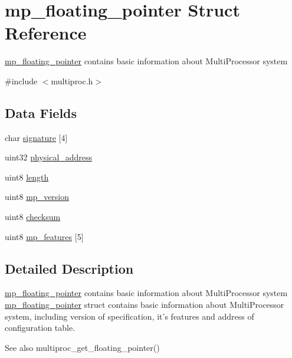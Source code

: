 \hypertarget{structmp__floating__pointer}{
\section{mp\_\-floating\_\-pointer Struct Reference}
\label{structmp__floating__pointer}
}


\hyperlink{structmp__floating__pointer}{mp\_\-floating\_\-pointer} contains basic information about MultiProcessor system  




{\ttfamily \#include $<$multiproc.h$>$}

\subsection*{Data Fields}
\begin{DoxyCompactItemize}
\item 
char \hyperlink{structmp__floating__pointer_a7a7d6817d70f64be4bfd36433f70aafa}{signature} \mbox{[}4\mbox{]}
\item 
uint32 \hyperlink{structmp__floating__pointer_aa3d9d8256dbd774b7c2dd6c18ad310e3}{physical\_\-address}
\item 
uint8 \hyperlink{structmp__floating__pointer_ade2aae9bc2dd565811eeed02d88f00e0}{length}
\item 
uint8 \hyperlink{structmp__floating__pointer_a82fa98b3895b4442d2fb20710b652613}{mp\_\-version}
\item 
uint8 \hyperlink{structmp__floating__pointer_a53870a8883745e14a0dc97693f6423d7}{checksum}
\item 
uint8 \hyperlink{structmp__floating__pointer_a6d79ccff9fab2288d0ac0a9702a8e8bd}{mp\_\-features} \mbox{[}5\mbox{]}
\end{DoxyCompactItemize}


\subsection{Detailed Description}
\hyperlink{structmp__floating__pointer}{mp\_\-floating\_\-pointer} contains basic information about MultiProcessor system \hyperlink{structmp__floating__pointer}{mp\_\-floating\_\-pointer} struct contains basic information about MultiProcessor system, including version of specification, it's features and address of configuration table.

\begin{DoxySeeAlso}{See also}
multiproc\_\-get\_\-floating\_\-pointer() 
\end{DoxySeeAlso}


